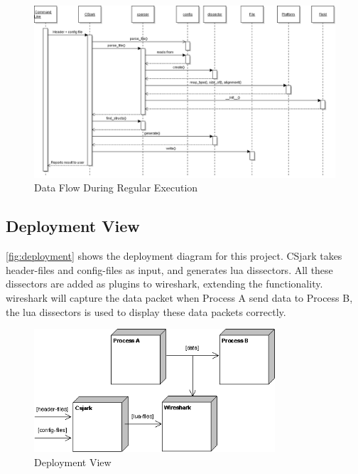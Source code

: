 \begin{figure}[htb]
	\center
	\includegraphics[width=\textwidth]{./evaluation/img/FinalSequenceDiagram}
	\caption{Data Flow During Regular Execution\label{fig:processview}}
\end{figure}


\subsection{Deployment View}

\autoref{fig:deployment} shows the deployment diagram for this project. CSjark 
takes \gls{header}-files and config-files as input, and generates \Gls{lua} 
\glspl{dissector}. All these \glspl{dissector} are added as plugins to 
\Gls{wireshark}, extending the functionality. \Gls{wireshark} will capture the 
data packet when Process A send data to Process B, the \Gls{lua} 
\glspl{dissector} is used to display these data packets correctly.

\begin{figure}[htb]
	\center
	\includegraphics[width=0.8\textwidth]{./planning/img/Deployment}
	\caption{Deployment View\label{fig:deployment}}
\end{figure}

